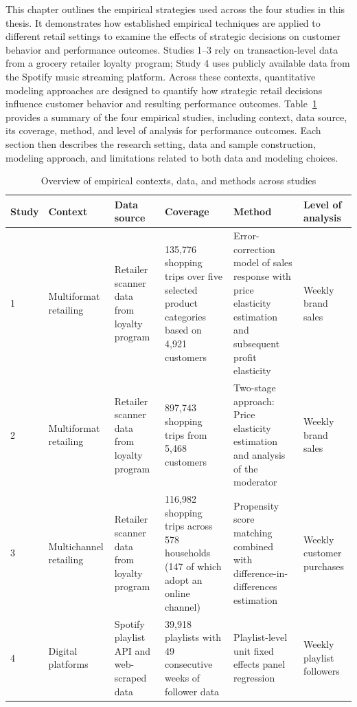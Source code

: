 This chapter outlines the empirical strategies used across the four studies in this thesis. It demonstrates how established empirical techniques are applied to different retail settings to examine the effects of strategic decisions on customer behavior and performance outcomes. Studies 1–3 rely on transaction-level data from a grocery retailer loyalty program; Study 4 uses publicly available data from the Spotify music streaming platform. Across these contexts, quantitative modeling approaches are designed to quantify how strategic retail decisions influence customer behavior and resulting performance outcomes. Table~\ref{tab:empirical_overview} provides a summary of the four empirical studies, including context, data source, its coverage, method, and level of analysis for performance outcomes. Each section then describes the research setting, data and sample construction, modeling approach, and limitations related to both data and modeling choices.

\begin{table}[htbp]
\centering
\begin{tabular}{p{0.4cm} p{1.2cm} p{1.9cm} p{2.8cm} p{3.2cm} p{1.2cm}}
\hline
\textbf{Study} & \textbf{Context} & \textbf{Data source} & \textbf{Coverage} & \textbf{Method} & \textbf{Level of analysis} \\
\hline

1 & Multiformat retailing 
& Retailer scanner data from loyalty program 
& 135,776 shopping trips over five selected product categories based on 4,921 customers 
& Error-correction model of sales response with price elasticity estimation and subsequent profit elasticity 
& Weekly brand sales \\
\hline

2 & Multiformat retailing 
& Retailer scanner data from loyalty program 
& 897,743 shopping trips from 5,468 customers 
& Two-stage approach: Price elasticity estimation and analysis of the moderator
& Weekly brand sales \\
\hline

3 & Multichannel retailing 
& Retailer scanner data from loyalty program 
& 116,982 shopping trips across 578 households (147 of which adopt an online channel) 
& Propensity score matching combined with difference-in-differences estimation 
& Weekly customer purchases \\
\hline

4 & Digital platforms 
& Spotify playlist API and web-scraped data 
& 39,918 playlists with 49 consecutive weeks of follower data 
& Playlist-level unit fixed effects panel regression 
& Weekly playlist followers \\

\hline
\end{tabular}
\caption{Overview of empirical contexts, data, and methods across studies}
\label{tab:empirical_overview}
\end{table}

